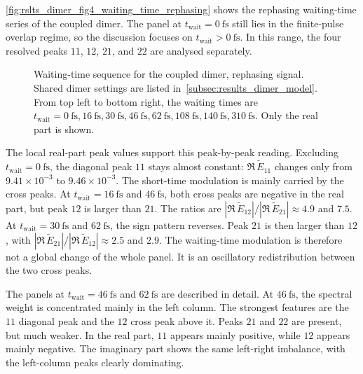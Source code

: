 \autoref{fig:rslts_dimer_fig4_waiting_time_rephasing} shows the rephasing waiting-time series of the coupled dimer. The panel at \(t_{\mathrm{wait}}=\SI{0}{\femto\second}\) still lies in the finite-pulse overlap regime, so the discussion focuses on \(t_{\mathrm{wait}}>\SI{0}{\femto\second}\). In this range, the four resolved peaks \(11\), \(12\), \(21\), and \(22\) are analysed separately.

\begin{figure}[htbp]
  \centering
\caption{Waiting-time sequence for the coupled dimer, rephasing signal. Shared
 dimer settings are listed in~\autoref{subsec:results_dimer_model}. From
 top left to bottom right, the waiting times are
 \(t_{\mathrm{wait}}=\SI{0}{\femto\second},\SI{16}{\femto\second},\SI{30}{\femto\second},\SI{46}{\femto\second},\SI{62}{\femto\second},\SI{108}{\femto\second},\SI{140}{\femto\second},\SI{310}{\femto\second}\).
 Only the real part is shown.}
  \label{fig:rslts_dimer_fig4_waiting_time_rephasing}
\end{figure}

The local real-part peak values support this peak-by-peak reading. Excluding \(t_{\mathrm{wait}}=\SI{0}{\femto\second}\), the diagonal peak \(11\) stays almost constant: \(\Re\,\tilde{E}_{11}\) changes only from \(9.41\times10^{-3}\) to \(9.46\times10^{-3}\). The short-time modulation is mainly carried by the cross peaks. At \(t_{\mathrm{wait}}=\SI{16}{\femto\second}\) and \(\SI{46}{\femto\second}\), both cross peaks are negative in the real part, but peak \(12\) is larger than \(21\). The ratios are \(|\Re\,\tilde{E}_{12}|/|\Re\,\tilde{E}_{21}| \approx 4.9\) and \(7.5\). At \(t_{\mathrm{wait}}=\SI{30}{\femto\second}\) and \(\SI{62}{\femto\second}\), the sign pattern reverses. Peak \(21\) is then larger than \(12\), with \(|\Re\,\tilde{E}_{21}|/|\Re\,\tilde{E}_{12}| \approx 2.5\) and \(2.9\). The waiting-time modulation is therefore not a global change of the whole panel. It is an oscillatory redistribution between the two cross peaks.

The panels at \(t_{\mathrm{wait}}=\SI{46}{\femto\second}\) and \(\SI{62}{\femto\second}\) are described in detail. At \(\SI{46}{\femto\second}\), the spectral weight is concentrated mainly in the left column. The strongest features are the $11$ diagonal peak and the $12$ cross peak above it. Peaks $21$ and $22$ are present, but much weaker. In the real part, $11$ appears mainly positive, while $12$ appears mainly negative. The imaginary part shows the same left-right imbalance, with the left-column peaks clearly dominating.

